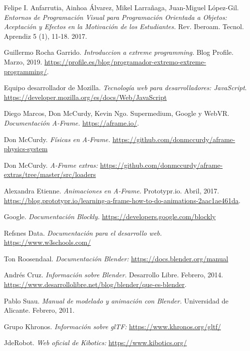 \begin{thebibliography}{99}
    Felipe I. Anfarrutia, Ainhoa Álvarez, Mikel Larrañaga, Juan-Miguel López-Gil. \textit{Entornos de Programación Visual para Programación Orientada a Objetos: Aceptación y Efectos en la Motivación de los Estudiantes.} Rev. Iberoam. Tecnol. Aprendiz 5 (1), 11-18. 2017.
    
    Guillermo Rocha Garrido.
    \textit{Introduccion a extreme programming.} Blog Profile.
    Marzo, 2019.
    \url{https://profile.es/blog/programador-extremo-extreme-programming/}. 
  
    Equipo desarrollador de Mozilla.
    \textit{Tecnología web para desarrolladores: JavaScript}.
    \url{https://developer.mozilla.org/es/docs/Web/JavaScript}

    Diego Marcos, Don McCurdy, Kevin Ngo. Supermedium, Google y WebVR.
    \textit{Documentación A-Frame.}
    \url{https://aframe.io/}. 
    
    Don McCurdy.
    \textit{Físicas en A-Frame.}
    \url{https://github.com/donmccurdy/aframe-physics-system}
    
    Don McCurdy.
    \textit{A-Frame extras: }
    \url{https://github.com/donmccurdy/aframe-extras/tree/master/src/loaders}
    
    Alexandra Etienne.
    \textit{Animaciones en A-Frame.}
    Prototypr.io. Abril, 2017.
    \url{https://blog.prototypr.io/learning-a-frame-how-to-do-animations-2aac1ae461da}. 

    Google.
    \textit{Documentación Blockly.}
    \url{https://developers.google.com/blockly}
    
    Refsnes Data.
    \textit{Documentación para el desarrollo web.}
    \url{https://www.w3schools.com/}
    
    Ton Roosendaal.
    \textit{Documentación Blender: }
    \url{https://docs.blender.org/manual}
    
    Andrés Cruz.
    \textit{Información sobre Blender.}
     Desarrollo Libre. Febrero, 2014.
    \url{https://www.desarrollolibre.net/blog/blender/que-es-blender}.
    
    Pablo Suau.
    \textit{Manual de modelado y animación con Blender.}  Universidad de Alicante. Febrero, 2011.
    
    Grupo Khronos.
    \textit{Información sobre glTF: }
    \url{https://www.khronos.org/gltf/}
   
   JdeRobot.
    \textit{Web oficial de Kibotics:}  
    \url{https://www.kibotics.org/}

\end{thebibliography}